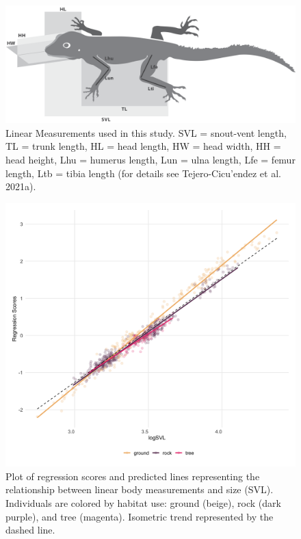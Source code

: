 \documentclass[
  11pt,
]{article}
\begin{document}
\newpage

\begin{figure}

{\centering \includegraphics[width=1\linewidth]{Figs/Fig1} 

}

\caption{Linear Measurements used in this study. SVL = snout-vent length, TL = trunk length, HL = head length, HW = head width, HH = head height, Lhu = humerus length, Lun = ulna length, Lfe = femur length, Ltb = tibia length (for details see Tejero-Cicu{'{e}}ndez et al. 2021a).}\label{fig:unnamed-chunk-3}
\end{figure}

\newpage

\begin{figure}
\includegraphics[width=1\linewidth]{Figs/figure_2_ggplot} \caption{Plot of regression scores and predicted lines representing the relationship between linear body measurements and size (SVL). Individuals are colored by habitat use: ground (beige), rock (dark purple), and tree (magenta). Isometric trend represented by the dashed line.}\label{fig:unnamed-chunk-4}
\end{figure}
\end{document}
